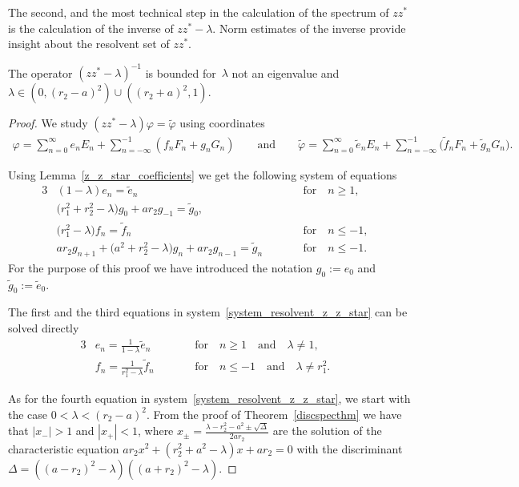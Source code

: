 The second, and the most technical step in the calculation of the spectrum of $zz^*$ is the calculation of the inverse
of $zz^*-\lambda$.
Norm estimates of the inverse provide insight about the resolvent set of $zz^*$.

\begin{Lemma}
\label{resolvent_z_z_star}
The operator $(zz^*-\lambda)^{-1}$ is bounded for~$\lambda$ not an eigenvalue and
$\lambda\in(0,(r_2-a)^2)\cup((r_2+a)^2,1)$.
\end{Lemma}

\begin{proof}
We study $(zz^*-\lambda)\varphi=\tilde{\varphi}$ using coordinates
\begin{gather*}
\varphi=\sum\limits_{n=0}^\infty e_nE_n+\sum\limits_{n=-\infty}^{-1}(f_nF_n+g_nG_n)
\qquad
\text{and}
\qquad
\tilde{\varphi}=\sum\limits_{n=0}^\infty \tilde{e}_nE_n+\sum\limits_{n=-\infty}^{-1}\big(\tilde{f}_nF_n+\tilde{g}_nG_n\big).
\end{gather*}

Using Lemma~\ref{z_z_star_coefficients} we get the following system of equations
\begin{alignat}{3}
&  (1-\lambda)e_n=\tilde{e}_n && \text{for}\quad n\ge1,&\nonumber
\\
&\big(r_1^2+ r_2^2-\lambda\big)g_0+ar_2g_{-1}=\tilde{g}_0,&&&\nonumber
\\
&\big(r_1^2-\lambda\big)f_n=\tilde{f}_n && \text{for}\quad n\le-1,&\nonumber
\\
& ar_2g_{n+1}+\big(a^2+r_2^2-\lambda\big)g_n+ar_2g_{n-1}=\tilde{g}_n \qquad & &\text{for}\quad n\le-1.& \label{system_resolvent_z_z_star}
\end{alignat}
For the purpose of this proof we have introduced the notation $g_0:=e_0$ and $\tilde{g}_0:=\tilde{e}_0$.

The f\/irst and the third equations in system~\eqref{system_resolvent_z_z_star} can be solved directly
\begin{alignat*}{3}%
& e_n=\frac{1}{1-\lambda}\tilde{e}_n \qquad && \text{for}\quad n\ge1
\quad
\text{and}
\quad
\lambda\neq 1, &
\\
& f_n=\frac{1}{r_1^2-\lambda}\tilde{f}_n \qquad && \text{for}\quad n\le-1
\quad
\text{and}
\quad
\lambda\neq r_1^2. &
\end{alignat*}

As for the fourth equation in system~\eqref{system_resolvent_z_z_star}, we start with the case $0<\lambda<(r_2-a)^2$.
From the proof of Theorem~\ref{discspecthm} we have that $|x_-|>1$ and $|x_+|<1$,
where $x_{\pm}=\frac{\lambda-r_2^2- a^2 \pm \sqrt{\Delta}}{2ar_2}$
are the solution of the characteristic equation $ar_2x^2+(r_2^2+a^2-\lambda)x+ar_2= 0$
with the discriminant $\Delta=((a-r_2)^2-\lambda)((a+r_2)^2-\lambda)$.


\end{proof}
